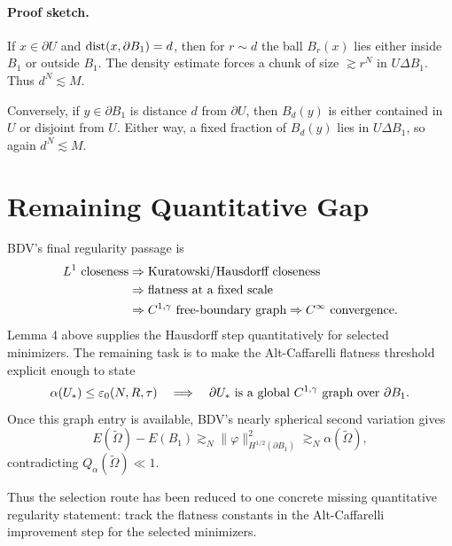\documentclass[11pt]{article}
\begin{document}
\paragraph{Proof sketch.}
If \(x\in\partial U\) and \({\rm dist}(x,\partial B_1)=d\), then for
\(r\sim d\) the ball \(B_r(x)\) lies either inside \(B_1\) or outside \(B_1\).
The density estimate forces a chunk of size \(\gtrsim r^N\) in
\(U\Delta B_1\). Thus \(d^N\lesssim M\).

Conversely, if \(y\in\partial B_1\) is distance \(d\) from \(\partial U\), then
\(B_d(y)\) is either contained in \(U\) or disjoint from \(U\). Either way, a
fixed fraction of \(B_d(y)\) lies in \(U\Delta B_1\), so again
\(d^N\lesssim M\).

\section{Remaining Quantitative Gap}

BDV's final regularity passage is
\[
\begin{aligned}
L^1\hbox{ closeness}
&\Rightarrow
\hbox{Kuratowski/Hausdorff closeness} \\
&\Rightarrow
\hbox{flatness at a fixed scale} \\
&\Rightarrow
C^{1,\gamma}\hbox{ free-boundary graph}
\Rightarrow
C^\infty\hbox{ convergence}.
\end{aligned}
\]
Lemma 4 above supplies the Hausdorff step quantitatively for selected
minimizers. The remaining task is to make the Alt-Caffarelli flatness threshold
explicit enough to state
\[
\alpha(U_*)\le \varepsilon_0(N,R,\tau)
\quad\Longrightarrow\quad
\partial U_*
\hbox{ is a global }C^{1,\gamma}\hbox{ graph over }\partial B_1.
\]
Once this graph entry is available, BDV's nearly spherical second variation
gives
\[
E(\widetilde\Omega)-E(B_1)
\gtrsim_N
\|\varphi\|_{H^{1/2}(\partial B_1)}^2
\gtrsim_N
\alpha(\widetilde\Omega),
\]
contradicting \(Q_\alpha(\widetilde\Omega)\ll1\).

Thus the selection route has been reduced to one concrete missing quantitative
regularity statement: track the flatness constants in the Alt-Caffarelli
improvement step for the selected minimizers.
\end{document}
